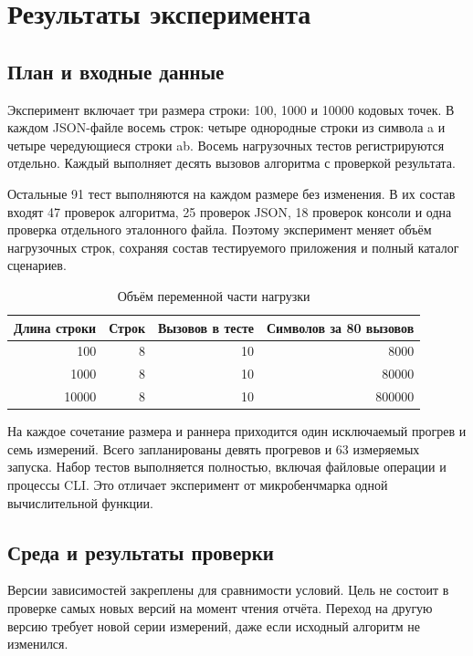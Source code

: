 \chapter{Результаты эксперимента}\label{ch3}
\section{План и входные данные}
Эксперимент включает три размера строки: 100, 1000 и 10000 кодовых точек. В каждом JSON-файле восемь строк: четыре однородные строки из символа a и четыре чередующиеся строки ab. Восемь нагрузочных тестов регистрируются отдельно. Каждый выполняет десять вызовов алгоритма с проверкой результата.

Остальные 91 тест выполняются на каждом размере без изменения. В их состав входят 47 проверок алгоритма, 25 проверок JSON, 18 проверок консоли и одна проверка отдельного эталонного файла. Поэтому эксперимент меняет объём нагрузочных строк, сохраняя состав тестируемого приложения и полный каталог сценариев.

\begin{table}[H]\centering
\caption{Объём переменной части нагрузки}
\begin{tabular}{rrrr}\toprule
Длина строки & Строк & Вызовов в тесте & Символов за 80 вызовов\\\midrule
100 & 8 & 10 & 8000\\
1000 & 8 & 10 & 80000\\
10000 & 8 & 10 & 800000\\\bottomrule
\end{tabular}
\end{table}

На каждое сочетание размера и раннера приходится один исключаемый прогрев и семь измерений. Всего запланированы девять прогревов и 63 измеряемых запуска. Набор тестов выполняется полностью, включая файловые операции и процессы CLI. Это отличает эксперимент от микробенчмарка одной вычислительной функции.

\section{Среда и результаты проверки}


Версии зависимостей закреплены для сравнимости условий. Цель не состоит в проверке самых новых версий на момент чтения отчёта. Переход на другую версию требует новой серии измерений, даже если исходный алгоритм не изменился.


